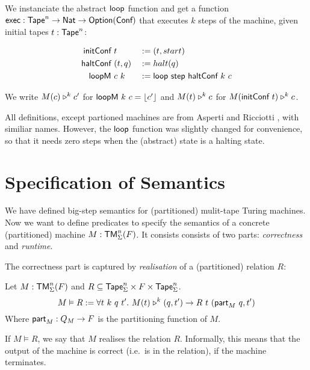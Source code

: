 We instanciate the abstract $\textsf{loop}$ function and get a function $\textsf{exec} : \textsf{Tape}^n \rightarrow \textsf{Nat} \rightarrow \textsf{Option}(\textsf{Conf})$ that executes $k$ steps
of the machine, given initial tapes $t: \textsf{Tape}^n$:

\begin{definition}
  \begin{alignat*}{3}
    \textsf{initConf}   &~t         &&:= (t, start) \\
    \textsf{haltConf}   &~(t, q)    &&:= halt(q) \\
    \textsf{loopM}      &~c~k       &&:= \textsf{loop}~\textsf{step}~\textsf{haltConf}~k~c
  \end{alignat*}
\end{definition}

We write $M(c) \mathrel{\triangleright}^k c'$ for $\textsf{loopM}~k~c = \left\lfloor {c'} \right\rfloor$ and $M(t) \mathrel{\triangleright}^k c$ for $M(\textsf{initConf}~t) \mathrel{\triangleright}^k c$.

All definitions, except partioned machines are from Asperti and Ricciotti \cite{asperti2015}, with similiar names.  However, the $\textsf{loop}$ function
was slightly changed for convenience, so that it needs zero steps when the (abstract) state is a halting state.

\section{Specification of Semantics}
\label{sec:spec_semantics}

We have defined big-step semantics for (partitioned) mulit-tape Turing machines.  Now we want to define predicates to specify the semantics of a
concrete (partitioned) machine $M: \textsf{TM}_\Sigma^n(F)$.  It consists consists of two parts: \emph{correctness} and \emph{runtime}.

The correctness part is captured by \emph{realisation} of a (partitioned) relation $R$:

\begin{definition}[Realisation]
  \label{def:realisation}
  Let $M:\textsf{TM}_\Sigma^n(F)$ and $R \subseteq \textsf{Tape}_\Sigma^n \times F \times \textsf{Tape}_\Sigma^n$.
  \[
    M \vDash R :=
    \forall t~k~q~t'.~M(t) \mathrel{\triangleright}^k (q, t') \rightarrow
    R~t~(\textsf{part}_M~q, t')
  \]
  Where $\textsf{part}_M : Q_M \rightarrow F$ is the partitioning function of $M$.
\end{definition}

If $M \vDash R$, we say that $M$ realises the relation $R$.  Informally, this means that the output of the machine is correct (i.e.\ is in the
relation), if the machine terminates.

